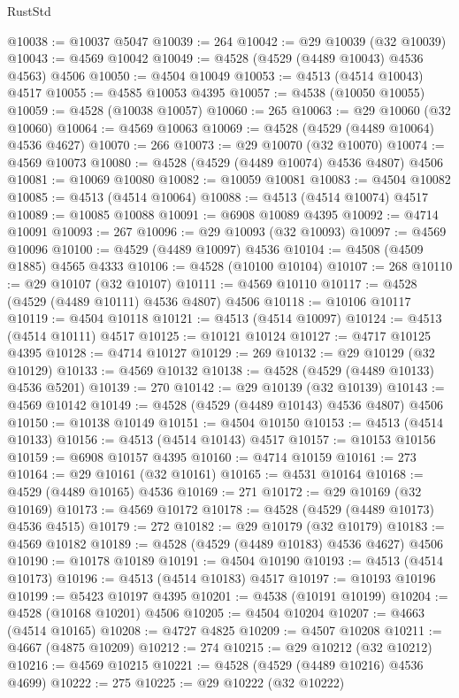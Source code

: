 \begin{lexlean}{RustStd}
\begin{coremodule}
@10038 := @10037 @5047
@10039 := 264
@10042 := @29 @10039 (@32 @10039)
@10043 := @4569 @10042
@10049 := @4528 (@4529 (@4489 @10043) @4536 @4563) @4506
@10050 := @4504 @10049
@10053 := @4513 (@4514 @10043) @4517
@10055 := @4585 @10053 @4395
@10057 := @4538 (@10050 @10055)
@10059 := @4528 (@10038 @10057)
@10060 := 265
@10063 := @29 @10060 (@32 @10060)
@10064 := @4569 @10063
@10069 := @4528 (@4529 (@4489 @10064) @4536 @4627)
@10070 := 266
@10073 := @29 @10070 (@32 @10070)
@10074 := @4569 @10073
@10080 := @4528 (@4529 (@4489 @10074) @4536 @4807) @4506
@10081 := @10069 @10080
@10082 := @10059 @10081
@10083 := @4504 @10082
@10085 := @4513 (@4514 @10064)
@10088 := @4513 (@4514 @10074) @4517
@10089 := @10085 @10088
@10091 := @6908 @10089 @4395
@10092 := @4714 @10091
@10093 := 267
@10096 := @29 @10093 (@32 @10093)
@10097 := @4569 @10096
@10100 := @4529 (@4489 @10097) @4536
@10104 := @4508 (@4509 @1885) @4565 @4333
@10106 := @4528 (@10100 @10104)
@10107 := 268
@10110 := @29 @10107 (@32 @10107)
@10111 := @4569 @10110
@10117 := @4528 (@4529 (@4489 @10111) @4536 @4807) @4506
@10118 := @10106 @10117
@10119 := @4504 @10118
@10121 := @4513 (@4514 @10097)
@10124 := @4513 (@4514 @10111) @4517
@10125 := @10121 @10124
@10127 := @4717 @10125 @4395
@10128 := @4714 @10127
@10129 := 269
@10132 := @29 @10129 (@32 @10129)
@10133 := @4569 @10132
@10138 := @4528 (@4529 (@4489 @10133) @4536 @5201)
@10139 := 270
@10142 := @29 @10139 (@32 @10139)
@10143 := @4569 @10142
@10149 := @4528 (@4529 (@4489 @10143) @4536 @4807) @4506
@10150 := @10138 @10149
@10151 := @4504 @10150
@10153 := @4513 (@4514 @10133)
@10156 := @4513 (@4514 @10143) @4517
@10157 := @10153 @10156
@10159 := @6908 @10157 @4395
@10160 := @4714 @10159
@10161 := 273
@10164 := @29 @10161 (@32 @10161)
@10165 := @4531 @10164
@10168 := @4529 (@4489 @10165) @4536
@10169 := 271
@10172 := @29 @10169 (@32 @10169)
@10173 := @4569 @10172
@10178 := @4528 (@4529 (@4489 @10173) @4536 @4515)
@10179 := 272
@10182 := @29 @10179 (@32 @10179)
@10183 := @4569 @10182
@10189 := @4528 (@4529 (@4489 @10183) @4536 @4627) @4506
@10190 := @10178 @10189
@10191 := @4504 @10190
@10193 := @4513 (@4514 @10173)
@10196 := @4513 (@4514 @10183) @4517
@10197 := @10193 @10196
@10199 := @5423 @10197 @4395
@10201 := @4538 (@10191 @10199)
@10204 := @4528 (@10168 @10201) @4506
@10205 := @4504 @10204
@10207 := @4663 (@4514 @10165)
@10208 := @4727 @4825
@10209 := @4507 @10208
@10211 := @4667 (@4875 @10209)
@10212 := 274
@10215 := @29 @10212 (@32 @10212)
@10216 := @4569 @10215
@10221 := @4528 (@4529 (@4489 @10216) @4536 @4699)
@10222 := 275
@10225 := @29 @10222 (@32 @10222)

\end{coremodule}
\end{lexlean}
